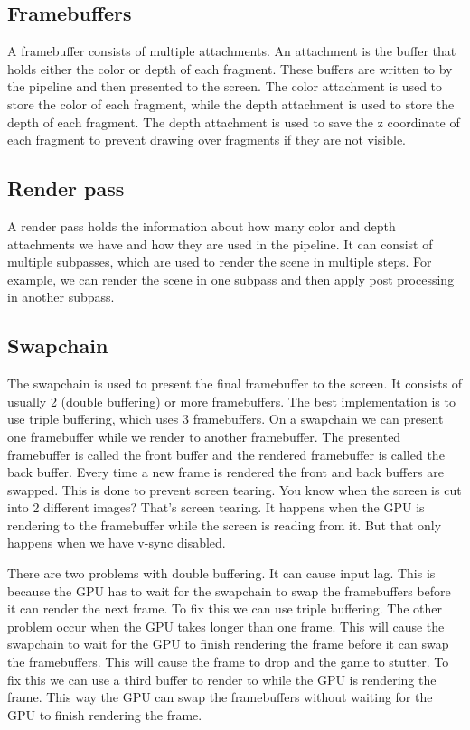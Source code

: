 \documentclass[12pt]{report} \usepackage{preamble}
\begin{document}
\subsection{Framebuffers}

A framebuffer consists of multiple attachments. An attachment is the buffer
that holds either the color or depth of each fragment.
These buffers are written to by the pipeline and then presented to the screen.
The color attachment is used to store the color of each fragment,
while the depth attachment is used to store the depth of each fragment.
The depth attachment is used to save the z coordinate of each fragment to prevent
drawing over fragments if they are not visible. \cite{framebuffers}

\subsection{Render pass}

A render pass holds the information about how many color and depth attachments
we have and how they are used in the pipeline.
It can consist of multiple subpasses, which are used to render the scene in multiple steps.
For example, we can render the scene
in one subpass and then apply post processing in another subpass. \cite{render-pass}

\subsection{Swapchain}

The swapchain is used to present the final framebuffer to the screen.
It consists of usually 2 (double buffering) or more framebuffers. The best implementation
is to use triple buffering, which uses 3 framebuffers.
On a swapchain we can present one framebuffer while we render to another framebuffer.
The presented framebuffer is called the front buffer and the rendered framebuffer
is called the back buffer. Every time a new frame is rendered the
front and back buffers are swapped. This is done to prevent screen tearing.
You know when the screen is cut into 2 different images? That's screen tearing.
It happens when the \ac{GPU} is rendering to the framebuffer while the screen is reading from it.
But that only happens when we have v-sync disabled.

There are two problems with double buffering. It can cause input lag.
This is because the \ac{GPU} has to wait for the swapchain to swap the framebuffers
before it can render the next frame. To fix this we can use triple buffering.
The other problem occur when the \ac{GPU} takes longer than one frame.
This will cause the swapchain to wait for the \ac{GPU} to finish rendering the frame
before it can swap the framebuffers. This will cause the frame
to drop and the game to stutter. To fix this we can use a third buffer
to render to while the \ac{GPU} is rendering the frame. This way the \ac{GPU} can
swap the framebuffers without waiting for the \ac{GPU} to finish rendering the frame. \cite{swapchain}
\end{document}
